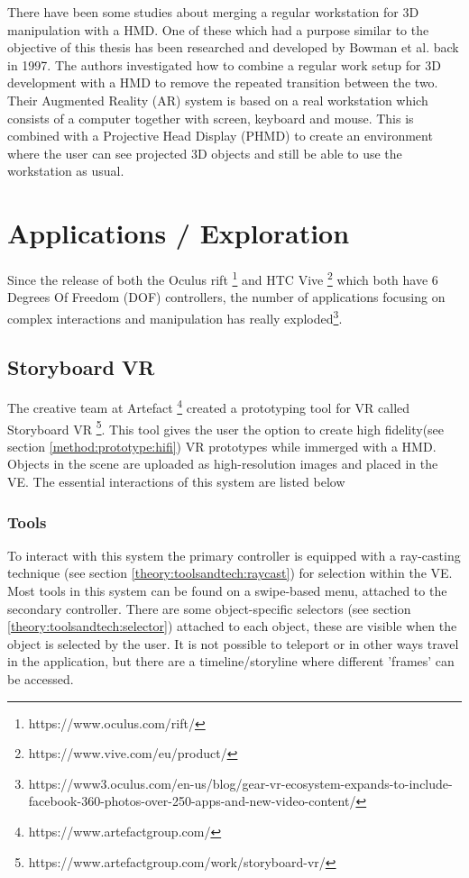 There have been some studies about merging a regular workstation for 3D manipulation with a HMD. One of these which had a purpose similar to the objective of this thesis has been researched and developed by Bowman et al. back in 1997. \cite{relatedwork:kijimaand1997transition} The authors investigated how to combine a regular work setup for 3D development with a HMD to remove the repeated transition between the two. Their Augmented Reality (AR) system is based on a real workstation which consists of a computer together with screen, keyboard and mouse. This is combined with a Projective Head Display (PHMD) to create an environment where the user can see projected 3D objects and still be able to use the workstation as usual.
\chapter{Applications / Exploration}
Since the release of both the Oculus rift \footnote{https://www.oculus.com/rift/} and HTC Vive \footnote{https://www.vive.com/eu/product/} which both have 6 Degrees Of Freedom (DOF) controllers, the number of applications focusing on complex interactions and manipulation has really exploded\footnote{https://www3.oculus.com/en-us/blog/gear-vr-ecosystem-expands-to-include-facebook-360-photos-over-250-apps-and-new-video-content/}.
\section{Storyboard VR}
The creative team at Artefact \footnote{https://www.artefactgroup.com/} created a prototyping tool for VR called Storyboard VR \footnote{https://www.artefactgroup.com/work/storyboard-vr/}. This tool gives the user the option to create high fidelity(see section \ref{method:prototype:hifi})  VR prototypes while immerged with a HMD. Objects in the scene are uploaded as high-resolution images and placed in the VE. The essential interactions of this system are listed below
\subsection{Tools}
To interact with this system the primary controller is equipped with a ray-casting technique (see section \ref{theory:toolsandtech:raycast}) for selection within the VE.
Most tools in this system can be found on a swipe-based menu, attached to the secondary controller. There are some object-specific selectors (see section \ref{theory:toolsandtech:selector}) attached to each object, these are visible when the object is selected by the user. It is not possible to teleport or in other ways travel in the application, but there are  a timeline/storyline where different 'frames' can be accessed.

